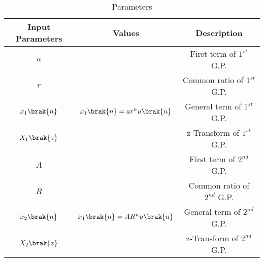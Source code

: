 \begin{table}[htbp]
    \centering
    \begin{tabular}{|c|c|c|} \hline
      \textbf{Input Parameters} & \textbf{Values} & \textbf{Description} \\ \hline
      $a$ & & First term of $1^{st}$ G.P. \\ \hline
      $r$ & & Common ratio of $1^{st}$ G.P. \\ \hline
      $x_1\brak{n}$ & $x_1\brak{n}=ar^nu\brak{n}$& General term of $1^{st}$ G.P. \\ \hline
      $X_1\brak{z}$ & & z-Transform of $1^{st}$ G.P. \\ \hline
      $A$ & & First term of $2^{nd}$ G.P. \\ \hline
      $R$ & & Common ratio of $2^{nd}$ G.P. \\ \hline
      $x_2\brak{n}$ & $x_1\brak{n}=AR^nu\brak{n}$& General term of $2^{nd}$ G.P. \\ \hline
      $X_2\brak{z}$ & & z-Transform of $2^{nd}$ G.P. \\ \hline
    \end{tabular}
    \vspace{3pt}
    \caption{Parameters}
\end{table}
